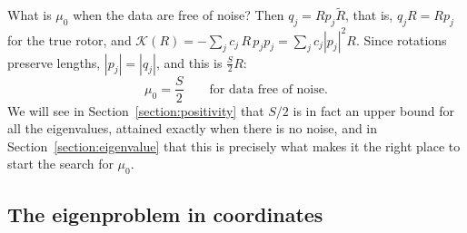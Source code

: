 \documentclass{birkjour}
\theoremstyle{definition}
\theoremstyle{remark}
\numberwithin{equation}{section}
\newcommand{\rev}[1]{\widetilde{#1}}
\newcommand{\K}{\mathcal{K}}
\begin{document}
What is $\mu_0$ when the data are free of noise? Then $q_j = R p_j \rev{R}$, that is, $q_j R = R p_j$ for the true rotor, and $\K(R) = -\sum_j c_j\, R\, p_j p_j = \sum_j c_j |p_j|^2 R$. Since rotations preserve lengths, $|p_j| = |q_j|$, and this is $\frac{S}{2} R$:
\begin{equation}
\label{eqn:exact_eigenvalue}
\mu_0 = \frac{S}{2} \qquad \text{for data free of noise.}
\end{equation}
We will see in Section~\ref{section:positivity} that $S/2$ is in fact an upper bound for all the eigenvalues, attained exactly when there is no noise, and in Section~\ref{section:eigenvalue} that this is precisely what makes it the right place to start the search for $\mu_0$.

\subsection{The eigenproblem in coordinates}
\end{document}
